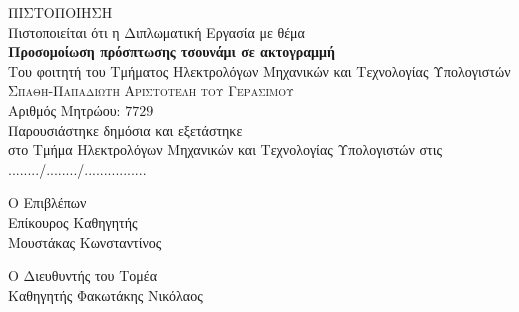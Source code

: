 \large
\begin{center}
  {\huge \textsc{ΠΙΣΤΟΠΟΙΗΣΗ}}\\[1cm]
  Πιστοποιείται ότι η Διπλωματική Εργασία με θέμα\\[0.5cm]
  \textbf{\Large Προσομοίωση πρόσπτωσης τσουνάμι σε ακτογραμμή}\\[1cm]
  Του φοιτητή του Τμήματος Ηλεκτρολόγων Μηχανικών και Τεχνολογίας Υπολογιστών\\[0.5cm]
  \textsc{\Large Σπαθη-Παπαδιωτη Αριστοτελη του Γερασιμου}\\[10pt]
  Αριθμός Μητρώου: $7729$\\[2cm]
  Παρουσιάστηκε δημόσια και εξετάστηκε\\στο Τμήμα Ηλεκτρολόγων Μηχανικών και
  Τεχνολογίας Υπολογιστών στις\\[0.5cm]
  ......../......../................\\
\end{center}

\vfill
\begin{minipage}[t]{0.5\textwidth}
  \begin{flushleft}
    Ο Επιβλέπων\\
    Επίκουρος Καθηγητής\\
    Μουστάκας Κωνσταντίνος
  \end{flushleft}
\end{minipage}
\begin{minipage}[t]{0.5\textwidth}
  \begin{flushright}
    Ο Διευθυντής του Τομέα\\
    Καθηγητής Φακωτάκης Νικόλαος
  \end{flushright}
\end{minipage}
\thispagestyle{empty}
\normalsize
\newpage

